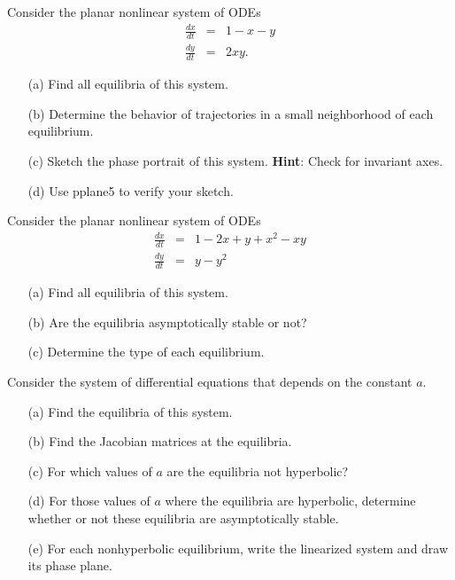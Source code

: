 \documentclass{ximera}
\begin{document}
\begin{exercise} \label{c8.2.5}
Consider the planar nonlinear system of ODEs
\begin{eqnarray*}
\frac{dx}{dt} & = & 1 - x - y \\
\frac{dy}{dt} & = & 2xy. 
\end{eqnarray*}
\begin{itemize}
\item[(a)] Find all equilibria of this system.
\item[(b)] Determine the behavior of trajectories in a small
neighborhood of each equilibrium.
\item[(c)] Sketch the phase portrait of this system.  {\bf Hint}: Check
for invariant axes.
\item[(d)] Use {\sf pplane5} to verify your sketch.
\end{itemize}
\end{exercise}

\begin{exercise} \label{c8.2.6}
Consider the planar nonlinear system of ODEs
\begin{eqnarray*}
\frac{dx}{dt} & = & 1 - 2x + y + x^2 - xy \\
\frac{dy}{dt} & = & y - y^2
\end{eqnarray*}
\begin{itemize}
\item[(a)] Find all equilibria of this system.
\item[(b)] Are the equilibria asymptotically stable or not?
\item[(c)] Determine the type of each equilibrium.
\end{itemize}
\end{exercise}

\begin{exercise} \label{c8.2.7}
Consider the system of differential equations 
that depends on the constant $a$.  
\begin{itemize}
\item[(a)]	Find the equilibria of this system.
\item[(b)]	Find the Jacobian matrices at the equilibria.  
\item[(c)]	For which values of $a$ are the equilibria not
		hyperbolic?
\item[(d)]	For those values of $a$ where the equilibria are 
		hyperbolic, determine whether or not these equilibria 
		are asymptotically stable.
\item[(e)]	For each nonhyperbolic equilibrium, write the linearized 
		system and draw its phase plane.
\end{itemize}
\end{exercise}
\end{document}
